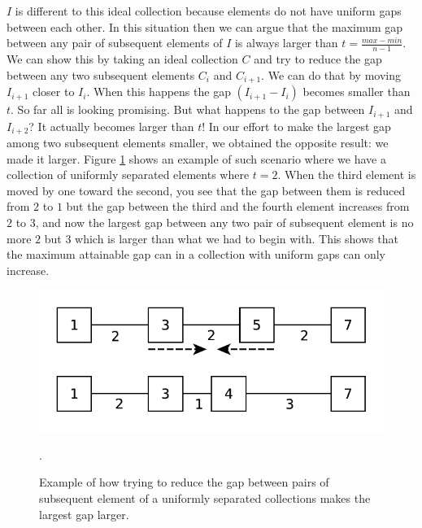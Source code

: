$I$ is different to this ideal collection because elements do not have uniform gaps between each
other. In this situation then we can argue that the maximum gap between any pair of subsequent
elements of $I$ is always larger than $t=\frac{max-min}{n-1}$. We can show this by taking an ideal
collection $C$ and try to reduce the gap between any two subsequent elements $C_{i}$ and $C_{i+1}$.
We can do that by moving $I_{i+1}$ closer to $I_{i}$. When this happens the gap $(I_{i+1}-I_{i})$
becomes smaller than $t$. So far all is looking promising. But what happens to the gap between
$I_{i+1}$ and $I_{i+2}$? It actually becomes larger than $t$! In our effort to make the largest gap
among two subsequent elements smaller, we obtained the opposite result: we made it larger. Figure
\ref{fig:max_gap:move_t} shows an example of such scenario where we have a collection of uniformly
separated elements where $t  = 2$. When the third element is moved by one toward the second, you see
that the gap between them is reduced from $2$ to $1$ but the gap between the third and the fourth
element increases from $2$ to $3$, and now the largest gap between any two pair of subsequent
element is no more $2$ but $3$ which is larger than what we had to begin with. This shows that the
maximum attainable gap can in a  collection with uniform gaps can only increase. 
\begin{figure}
	\centering
	\includegraphics[width=\textwidth]{sources/max_gap/images/move_t}
	\caption{Example of how trying to reduce the gap between pairs of subsequent element of a
	uniformly separated collections makes the largest gap larger.}.
   \label{fig:max_gap:move_t}
\end{figure}


